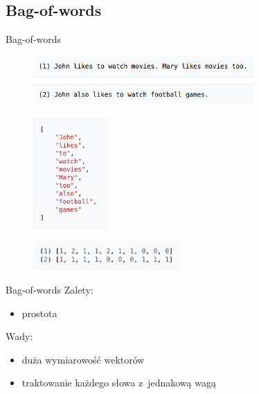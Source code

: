 \documentclass{beamer}
\begin{document}
	\subsection{Bag-of-words}
	\begin{frame}{Bag-of-words}
		\begin{figure}
			\centering
			\includegraphics[width=0.75\textwidth]{img/bow_sents.png}
		\end{figure}
		\pause
		\begin{figure}
			\centering
			\includegraphics[width=0.25\textwidth]{img/bow_dict.png}
		\end{figure}
		\pause
		\begin{figure}
			\centering
			\includegraphics[width=0.5\textwidth]{img/bow_repr.png}
		\end{figure}
	\end{frame}
	\begin{frame}{Bag-of-words}
		Zalety:
		\begin{itemize}
			\item prostota \pause
		\end{itemize}
		Wady:
		\begin{itemize}
			\item duża wymiarowość wektorów \pause
			\item traktowanie każdego słowa z~jednakową wagą
		\end{itemize}
	\end{frame}
\end{document}
